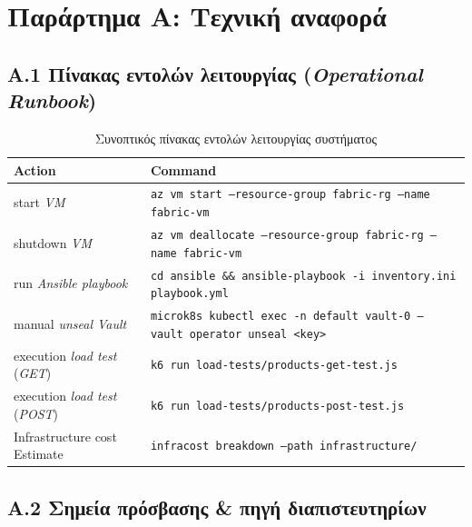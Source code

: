 \newpage
\section*{Παράρτημα Α: Τεχνική αναφορά}

\subsection*{Α.1 Πίνακας εντολών λειτουργίας (\textit{Operational Runbook})}

\begin{table}[htbp]
\centering
\renewcommand{\arraystretch}{1.5}
\caption{Συνοπτικός πίνακας εντολών λειτουργίας συστήματος}
\label{tab:runbook}
\small
\begin{tabularx}{\textwidth}{| >{\centering\arraybackslash}p{4.5cm} | X |}
\hline
\rowcolor{HUAblue} 
\textbf{\color{white} Action} & \textbf{\color{white} Command} \\ \hline

start \textit{VM} & \texttt{az vm start --resource-group fabric-rg --name fabric-vm} \\ \hline

\rowcolor{lightgray!30}
shutdown \textit{VM} & \texttt{az vm deallocate --resource-group fabric-rg --name fabric-vm} \\ \hline

run \textit{Ansible playbook} & \texttt{cd ansible \&\& ansible-playbook -i inventory.ini playbook.yml} \\ \hline

\rowcolor{lightgray!30}
manual \textit{unseal Vault} & \texttt{microk8s kubectl exec -n default vault-0 -- vault operator unseal <key>} \\ \hline

execution \textit{load test} (\textit{GET}) & \texttt{k6 run load-tests/products-get-test.js} \\ \hline

\rowcolor{lightgray!30}
execution \textit{load test} (\textit{POST}) & \texttt{k6 run load-tests/products-post-test.js} \\ \hline

Infrastructure cost Estimate & \texttt{infracost breakdown --path infrastructure/} \\ \hline
\end{tabularx}
\end{table}

\subsection*{Α.2 Σημεία πρόσβασης \& πηγή διαπιστευτηρίων}

